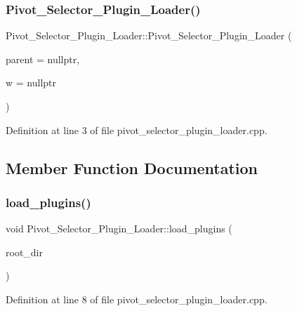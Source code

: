 \subsubsection{\texorpdfstring{Pivot\+\_\+\+Selector\+\_\+\+Plugin\+\_\+\+Loader()}{Pivot\_Selector\_Plugin\_Loader()}}
{\footnotesize\ttfamily Pivot\+\_\+\+Selector\+\_\+\+Plugin\+\_\+\+Loader\+::\+Pivot\+\_\+\+Selector\+\_\+\+Plugin\+\_\+\+Loader (\begin{DoxyParamCaption}\item[{Q\+Object $\ast$}]{parent = {\ttfamily nullptr},  }\item[{\hyperlink{classMainWindow}{Main\+Window} $\ast$}]{w = {\ttfamily nullptr} }\end{DoxyParamCaption})\hspace{0.3cm}{\ttfamily [explicit]}}



Definition at line 3 of file pivot\+\_\+selector\+\_\+plugin\+\_\+loader.\+cpp.



\subsection{Member Function Documentation}
\mbox{\label{classPivot__Selector__Plugin__Loader_ad29a07fed537d3aa5f6a64c10dc3c3c5}} 
\subsubsection{\texorpdfstring{load\+\_\+plugins()}{load\_plugins()}}
{\footnotesize\ttfamily void Pivot\+\_\+\+Selector\+\_\+\+Plugin\+\_\+\+Loader\+::load\+\_\+plugins (\begin{DoxyParamCaption}\item[{Q\+Dir}]{root\+\_\+dir }\end{DoxyParamCaption})}



Definition at line 8 of file pivot\+\_\+selector\+\_\+plugin\+\_\+loader.\+cpp.


